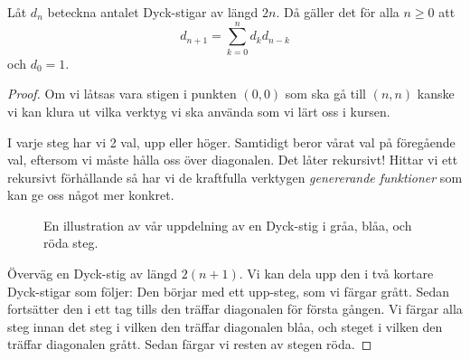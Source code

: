 \documentclass{tufte-handout}
\begin{document}
\begin{lemma}\label{dyck_path_recursion_lemma}
    Låt $d_n$ beteckna antalet Dyck-stigar av längd $2n$. Då gäller det för alla $n \geq 0$ att
    $$d_{n+1} = \sum_{k=0}^{n} d_k d_{n-k}$$
    och $d_0 = 1$.

    \begin{proof}
     Om vi låtsas vara stigen i punkten $(0,0)$ som ska gå till $(n,n)$ kanske vi kan klura ut vilka verktyg vi ska använda som vi lärt oss i kursen.\par
     \noindent I varje steg har vi 2 val, upp eller höger. Samtidigt beror vårat val på föregående val, eftersom vi måste hålla oss över diagonalen. Det låter rekursivt! Hittar vi ett rekursivt förhållande så har vi de kraftfulla verktygen \emph{genererande funktioner} som kan ge oss något mer konkret.\clearpage
     \begin{figure}[hbt!]
          \centering
          \caption{En illustration av vår uppdelning av en Dyck-stig i gråa, blåa, och röda steg.}
      \end{figure}
        Överväg en Dyck-stig av längd $2(n+1)$. Vi kan dela upp den i två kortare Dyck-stigar som följer: Den börjar med ett upp-steg, som vi färgar grått. Sedan fortsätter den i ett tag tills den träffar diagonalen för första gången. Vi färgar alla steg innan det steg i vilken den träffar diagonalen blåa, och steget i vilken den träffar diagonalen grått. Sedan färgar vi resten av stegen röda.


\end{proof}
\end{lemma}
\end{document}
